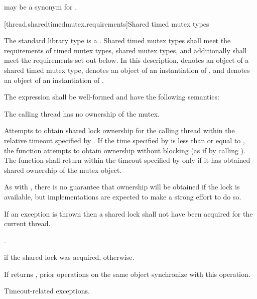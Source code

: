 \pnum
{} may be a synonym for .

[thread.sharedtimedmutex.requirements]{Shared timed mutex types}

\pnum
The standard library type  is a
. Shared timed mutex types shall meet the requirements of
timed mutex types,
shared mutex types, and additionally
shall meet the requirements set out below. In this description,
 denotes an object of a shared timed mutex type,
 denotes an object of an instantiation of
, and
 denotes an object of an instantiation of
.

\pnum
The expression  shall be well-formed and
have the following semantics:

\begin{itemdescr}
\pnum
\requires The calling thread has no ownership of the mutex.

\pnum
\effects Attempts to obtain
shared lock ownership for the calling thread within the relative
timeout specified by . If the time
specified by  is less than or equal to ,
the function attempts to obtain ownership without blocking (as if by calling
). The function shall return within the timeout
specified by  only if it has obtained shared ownership of the
mutex object. \begin{note} As with , there is no guarantee that
ownership will be obtained if the lock is available, but implementations are
expected to make a strong effort to do so. \end{note}
If an exception is thrown then a shared lock shall not have been acquired for
the current thread.

\pnum
\returntype {}.

\pnum
\returns {} if the shared lock was acquired,  otherwise.

\pnum
\sync If  returns , prior
 operations on the same object synchronize
with this operation.

\pnum
\throws Timeout-related exceptions.
\end{itemdescr}

